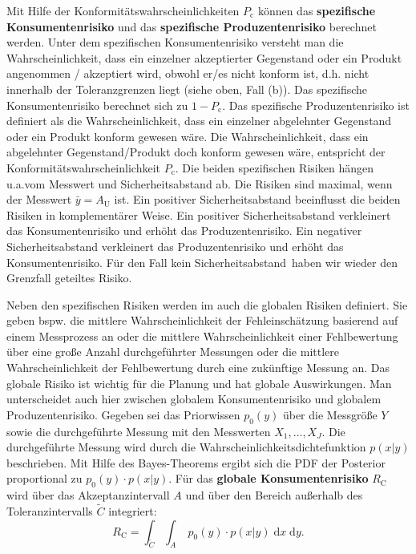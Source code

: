 Mit Hilfe der Konformitätswahrscheinlichkeiten $P_\mathrm{c}$ können das \textbf{spezifische Konsumentenrisiko} und das \textbf{spezifische Produzentenrisiko} berechnet werden. Unter dem spezifischen Konsumentenrisiko versteht man die Wahrscheinlichkeit, dass ein einzelner akzeptierter Gegenstand oder ein Produkt angenommen / akzeptiert wird, obwohl er/es nicht konform ist, d.h. nicht innerhalb der Toleranzgrenzen liegt (siehe oben, Fall (b)). Das spezifische Konsumentenrisiko berechnet sich zu $1-P_\mathrm{c}$. Das spezifische Produzentenrisiko ist definiert als die Wahrscheinlichkeit, dass ein einzelner abgelehnter Gegenstand oder ein Produkt konform gewesen wäre. Die Wahrscheinlichkeit, dass ein abgelehnter Gegenstand/Produkt doch konform gewesen wäre, entspricht der Konformitätswahrscheinlichkeit $P_\mathrm{c}$.
Die beiden spezifischen Risiken hängen u.a.vom Messwert und Sicherheitsabstand ab. Die
Risiken sind maximal, wenn der Messwert $\bar y = A_\textrm{U}$ ist. Ein positiver Sicherheitsabstand beeinflusst die beiden Risiken in komplementärer Weise. Ein positiver Sicherheitsabstand verkleinert das Konsumentenrisiko und erhöht das Produzentenrisiko.
Ein negativer Sicherheitsabstand verkleinert das Produzentenrisiko und erhöht das Konsumentenrisiko. Für den Fall  \glqq kein Sicherheitsabstand\grqq ~haben wir wieder
den Grenzfall \glqq geteiltes Risiko\grqq.

Neben den spezifischen Risiken werden im \cite{JCGM106} auch die globalen Risiken definiert. Sie geben bspw. die mittlere Wahrscheinlichkeit der Fehleinschätzung basierend auf einem Messprozess an oder die mittlere Wahrscheinlichkeit einer Fehlbewertung über eine große Anzahl durchgeführter Messungen oder die mittlere Wahrscheinlichkeit der Fehlbewertung durch eine zukünftige Messung an. Das globale Risiko ist wichtig für die Planung und hat globale Auswirkungen. Man unterscheidet auch hier zwischen globalem Konsumentenrisiko und globalem Produzentenrisiko.
Gegeben sei das Priorwissen $p_0(y)$ über die Messgröße $Y$ sowie die durchgeführte Messung mit den Messwerten $X_1,\ldots , X_J$. Die durchgeführte Messung wird durch die Wahrscheinlichkeitsdichtefunktion $p(x|y)$ beschrieben. Mit Hilfe des Bayes-Theorems ergibt sich die PDF der Posterior proportional zu $p_0(y)\cdot p(x|y)$. Für das \textbf{globale Konsumentenrisiko} $R_\mathrm{C}$  wird über das Akzeptanzintervall $A$ und über den
Bereich außerhalb des Toleranzintervalls $\tilde C$ integriert:
\begin{equation}
	R_\mathrm{C} =  \int_{\tilde C} \int_{A} \; p_0(y) \cdot p(x|y) \;\mathrm{d}x\; \mathrm{d}y.
	\label{eq:globalesKonsumentenrisiko}
\end{equation}

